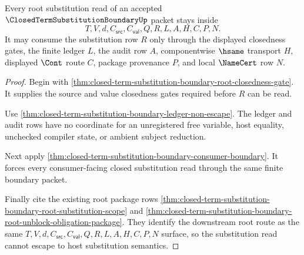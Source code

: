 \begin{theorem}
\label{thm:closed-term-substitution-boundary-root-substitution-nonescape}
Every root substitution read of an accepted $\ClosedTermSubstitutionBoundaryUp$ packet stays inside
$$
T,V,d,C_{\mathsf{src}},C_{\mathsf{val}},Q,R,L,A,H,C,P,N.
$$
It may consume the substitution row $R$ only through the displayed closedness gates, the finite ledger $L$, the audit row $A$, componentwise $\hsame$ transport $H$, displayed $\Cont$ route $C$, package provenance $P$, and local $\NameCert$ row $N$.
\end{theorem}
\begin{proof}
Begin with \autoref{thm:closed-term-substitution-boundary-root-closedness-gate}. It supplies the source and value closedness gates required before $R$ can be read.

Use \autoref{thm:closed-term-substitution-boundary-ledger-non-escape}. The ledger and audit rows have no coordinate for an unregistered free variable, host equality, unchecked compiler state, or ambient subject reduction.

Next apply \autoref{thm:closed-term-substitution-boundary-consumer-boundary}. It forces every consumer-facing closed substitution read through the same finite boundary packet.

Finally cite the existing root package rows \autoref{thm:closed-term-substitution-boundary-root-substitution-scope} and \autoref{thm:closed-term-substitution-boundary-root-unblock-obligation-package}. They identify the downstream root route as the same $T,V,d,C_{\mathsf{src}},C_{\mathsf{val}},Q,R,L,A,H,C,P,N$ surface, so the substitution read cannot escape to host substitution semantics.
\end{proof}

